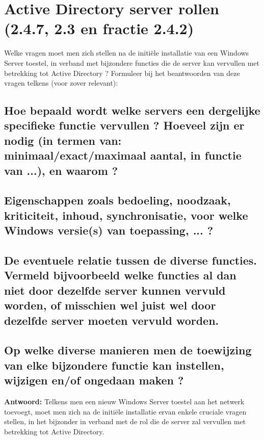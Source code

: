 \chapter{Active Directory server rollen (2.4.7, 2.3 en fractie 2.4.2)}
Welke vragen moet men zich stellen na de initiële installatie van een Windows Server toestel, in verband met bijzondere functies die de server kan vervullen met betrekking tot Active Directory ? Formuleer bij het beantwoorden van deze vragen telkens (voor zover relevant):
\section{Hoe bepaald wordt welke servers een dergelijke specifieke functie vervullen ? Hoeveel zijn er nodig (in termen van: minimaal/exact/maximaal aantal, in functie van ...), en waarom ?}
\section{Eigenschappen zoals bedoeling, noodzaak, kriticiteit, inhoud, synchronisatie, voor welke Windows versie(s) van toepassing, ... ?}
\section{De eventuele relatie tussen de diverse functies. Vermeld bijvoorbeeld welke functies al dan niet door dezelfde server kunnen vervuld worden, of misschien wel juist wel door dezelfde server moeten vervuld worden.}
\section{Op welke diverse manieren men de toewijzing van elke bijzondere functie kan instellen, wijzigen en/of ongedaan maken ?}

\clearpage
\textbf{Antwoord:}
Telkens men een nieuw Windows Server toestel aan het netwerk toevoegt, moet men zich na de initi\"ele installatie ervan enkele cruciale vragen stellen, in het bijzonder in verband met de rol die de server zal vervullen met betrekking tot Active Directory.

